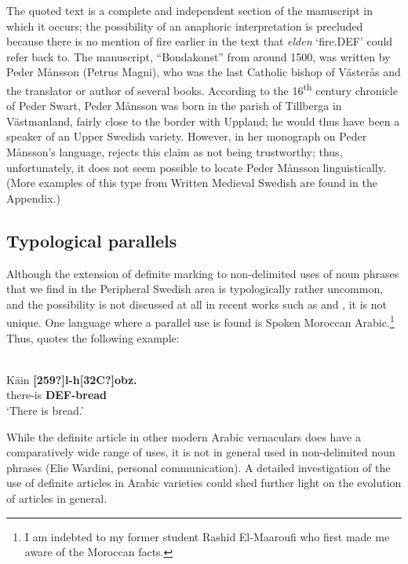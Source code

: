 \z

The quoted text is a complete and independent section of the manuscript in which it occurs; the possibility of an anaphoric interpretation is precluded because there is no mention of fire earlier in the text that \textit{elden} ‘fire.DEF’ could refer back to. The manuscript, “Bondakonst” from around 1500, was written by Peder Månsson (Petrus Magni), who was the last Catholic bishop of Västerås and the translator or author of several books. According to the 16\textsuperscript{th} century chronicle of Peder Swart, Peder Månsson was born in the parish of Tillberga in Västmanland, fairly close to the border with Uppland; he would thus have been a speaker of an Upper Swedish variety. However, in her monograph on Peder Månsson’s language, \citet[51]{Nordling2001} rejects this claim as not being trustworthy; thus, unfortunately, it does not seem possible to locate Peder Månsson linguistically. (More examples of this type from Written Medieval Swedish are found in the Appendix.) 

\subsection{ Typological parallels}
\label{bkm:Ref134937864}

Although the extension of definite marking to non-delimited uses of noun phrases that we find in the Peripheral Swedish area is typologically rather uncommon, and the possibility is not discussed at all in recent works such as \citet{Himmelmann1997} and \citet{Lyons1999}, it is not unique. One language where a parallel use is found is Spoken Moroccan Arabic.\footnote{ I am indebted to my former student Rashid El-Maaroufi who first made me aware of the Moroccan facts. } Thus, \citet[235]{Caubet1983} quotes the following example:

\ea
{}\\
\gll K\=ain  \textbf{[259?]l-h[32C?]obz.} \\
there-is  \textbf{DEF-bread}\\
\glt ‘There is bread.’

\z

While the definite article in other modern Arabic vernaculars does have a comparatively wide range of uses, it is not in general used in non-delimited noun phrases (Elie Wardini, personal communication). A detailed investigation of the use of definite articles in Arabic varieties could shed further light on the evolution of articles in general.

